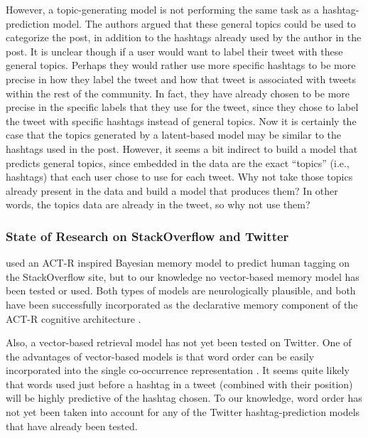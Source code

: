 \documentclass[man,floatsintext,donotrepeattitle]{apa6}
\begin{document}
However, a topic-generating model is not performing the same task as a hashtag-prediction model.
The authors argued that these general topics could be used to categorize the post, in addition to the hashtags already used by the author in the post.
It is unclear though if a user would want to label their tweet with these general topics.
Perhaps they would rather use more specific hashtags to be more precise in how they label the tweet and how that tweet is associated with tweets within the rest of the community.
In fact, they have already chosen to be more precise in the specific labels that they use for the tweet, since they chose to label the tweet with specific hashtags instead of general topics.
Now it is certainly the case that the topics generated by a latent-based model may be similar to the hashtags used in the post.
However, it seems a bit indirect to build a model that predicts general topics, since embedded in the data are the exact ``topics'' (i.e., hashtags) that each user chose to use for each tweet.
Why not take those topics already present in the data and build a model that produces them?
In other words, the topics data are already in the tweet, so why not use them?

\subsubsection{State of Research on StackOverflow and Twitter}

\textcite{Stanley2013} used an ACT-R inspired Bayesian memory model to predict human tagging on the StackOverflow site, but to our knowledge no vector-based memory model has been tested or used.
Both types of models are neurologically plausible, and both have been successfully incorporated as the declarative memory component of the ACT-R cognitive architecture \parencite{Rutledge2007}. 

Also, a vector-based retrieval model has not yet been tested on Twitter.
One of the advantages of vector-based models is that word order can be easily incorporated into the single co-occurrence representation \parencite{Jones2007}.
It seems quite likely that words used just before a hashtag in a tweet (combined with their position) will be highly predictive of the hashtag chosen.
To our knowledge, word order has not yet been taken into account for any of the Twitter hashtag-prediction models that have already been tested.
\end{document}
